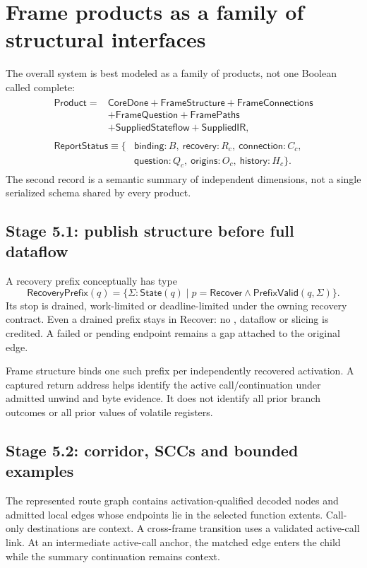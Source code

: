 \documentclass[11pt,a4paper]{article}
\newcommand{\ty}[1]{\mathsf{#1}}
\newcommand{\code}[1]{\texttt{\detokenize{#1}}}
\begin{document}
\section{Frame products as a family of structural interfaces}
\label{app:frames}
The overall system is best modeled as a family of products, not one Boolean
called complete:
\[
\begin{gathered}
\begin{aligned}
\ty{Product}={}&\ty{CoreDone}+\ty{FrameStructure}+\ty{FrameConnections}\\
 &+\ty{FrameQuestion}+\ty{FramePaths}\\
 &+\ty{SuppliedStateflow}+\ty{SuppliedIR},
\end{aligned}\\[4pt]
\begin{aligned}
\ty{ReportStatus}\equiv\bigl\{
 &\ty{binding}:B,\ \ty{recovery}:R_c,\ \ty{connection}:C_c,\\
 &\ty{question}:Q_c,\ \ty{origins}:O_c,\ \ty{history}:H_c\bigr\}.
\end{aligned}
\end{gathered}
\]
The second record is a semantic summary of independent dimensions, not a
single serialized schema shared by every product.

\subsection{Stage 5.1: publish structure before full dataflow}
A recovery prefix conceptually has type
\[
 \ty{RecoveryPrefix}(q)=
 \{\Sigma:\ty{State}(q)\mid p=\ty{Recover}\land\ty{PrefixValid}(q,\Sigma)\}.
\]
Its stop is drained, work-limited or deadline-limited under the owning
recovery contract. Even a drained prefix stays in Recover: no
\code{FinishRecovery}, dataflow or slicing is credited. A failed or pending
endpoint remains a gap attached to the original edge.

Frame structure binds one such prefix per independently recovered activation.
A captured return address helps identify the active call/continuation under
admitted unwind and byte evidence. It does not identify all prior branch
outcomes or all prior values of volatile registers.

\subsection{Stage 5.2: corridor, SCCs and bounded examples}
The represented route graph contains activation-qualified decoded nodes and
admitted local edges whose endpoints lie in the selected function extents.
Call-only destinations are context. A cross-frame transition uses a validated
active-call link. At an intermediate active-call anchor, the matched edge
enters the child while the summary continuation remains context.
\end{document}
